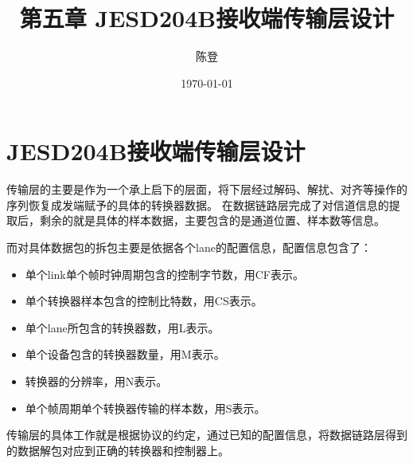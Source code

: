 \documentclass[UTF8]{ctexart}
\title{第五章 JESD204B接收端传输层设计}
\author{陈登}
\date{\today}
\begin{document}
\section{JESD204B接收端传输层设计}

传输层的主要是作为一个承上启下的层面，将下层经过解码、解扰、对齐等操作的序列恢复成发端赋予的具体的转换器数据。
在数据链路层完成了对信道信息的提取后，剩余的就是具体的样本数据，主要包含的是通道位置、样本数等信息。

而对具体数据包的拆包主要是依据各个lane的配置信息，配置信息包含了：
\begin{itemize}
  \item 单个link单个帧时钟周期包含的控制字节数，用CF表示。
  \item 单个转换器样本包含的控制比特数，用CS表示。
  \item 单个lane所包含的转换器数，用L表示。
  \item 单个设备包含的转换器数量，用M表示。
  \item 转换器的分辨率，用N表示。
  \item 单个帧周期单个转换器传输的样本数，用S表示。
\end{itemize}

传输层的具体工作就是根据协议的约定，通过已知的配置信息，将数据链路层得到的数据解包对应到正确的转换器和控制器上。

\subsection{}


\subsection{}

\subsection{}

\subsection{}


\end{document}
